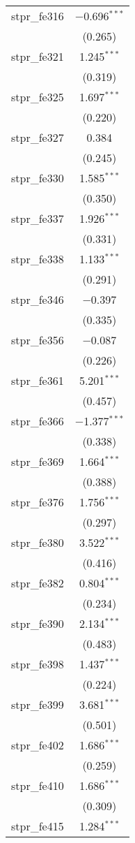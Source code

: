 \begin{table}[!htbp]
\begin{tabular}{@{\extracolsep{5pt}}lc}
  stpr\_fe316 & $-$0.696$^{***}$ \\ 
  & (0.265) \\ 
  stpr\_fe321 & 1.245$^{***}$ \\ 
  & (0.319) \\ 
  stpr\_fe325 & 1.697$^{***}$ \\ 
  & (0.220) \\ 
  stpr\_fe327 & 0.384 \\ 
  & (0.245) \\ 
  stpr\_fe330 & 1.585$^{***}$ \\ 
  & (0.350) \\ 
  stpr\_fe337 & 1.926$^{***}$ \\ 
  & (0.331) \\ 
  stpr\_fe338 & 1.133$^{***}$ \\ 
  & (0.291) \\ 
  stpr\_fe346 & $-$0.397 \\ 
  & (0.335) \\ 
  stpr\_fe356 & $-$0.087 \\ 
  & (0.226) \\ 
  stpr\_fe361 & 5.201$^{***}$ \\ 
  & (0.457) \\ 
  stpr\_fe366 & $-$1.377$^{***}$ \\ 
  & (0.338) \\ 
  stpr\_fe369 & 1.664$^{***}$ \\ 
  & (0.388) \\ 
  stpr\_fe376 & 1.756$^{***}$ \\ 
  & (0.297) \\ 
  stpr\_fe380 & 3.522$^{***}$ \\ 
  & (0.416) \\ 
  stpr\_fe382 & 0.804$^{***}$ \\ 
  & (0.234) \\ 
  stpr\_fe390 & 2.134$^{***}$ \\ 
  & (0.483) \\ 
  stpr\_fe398 & 1.437$^{***}$ \\ 
  & (0.224) \\ 
  stpr\_fe399 & 3.681$^{***}$ \\ 
  & (0.501) \\ 
  stpr\_fe402 & 1.686$^{***}$ \\ 
  & (0.259) \\ 
  stpr\_fe410 & 1.686$^{***}$ \\ 
  & (0.309) \\ 
  stpr\_fe415 & 1.284$^{***}$ \\ 

\end{tabular}
\end{table}

